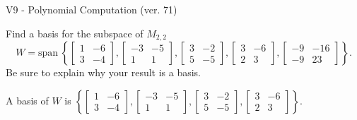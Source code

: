 \begin{exercise}
  \begin{exerciseTitle}V9 - Polynomial Computation (ver. 71)\end{exerciseTitle}
  \begin{exerciseStatement}
    Find a basis for the subspace of \(M_{2,2}\) 
\[W=\mathrm{span}\ \left\{\left[\begin{array}{cc}
1 & -6 \\
3 & -4
\end{array}\right] , \left[\begin{array}{cc}
-3 & -5 \\
1 & 1
\end{array}\right] , \left[\begin{array}{cc}
3 & -2 \\
5 & -5
\end{array}\right] , \left[\begin{array}{cc}
3 & -6 \\
2 & 3
\end{array}\right] , \left[\begin{array}{cc}
-9 & -16 \\
-9 & 23
\end{array}\right]\right\}.\]
 Be sure to explain why your result is a basis.


  \end{exerciseStatement}
  \begin{exerciseAnswer}
   A basis of \(W\) is  \(\left\{\left[\begin{array}{cc}
1 & -6 \\
3 & -4
\end{array}\right] , \left[\begin{array}{cc}
-3 & -5 \\
1 & 1
\end{array}\right] , \left[\begin{array}{cc}
3 & -2 \\
5 & -5
\end{array}\right] , \left[\begin{array}{cc}
3 & -6 \\
2 & 3
\end{array}\right]\right\}\).
  


  \end{exerciseAnswer}
\end{exercise}